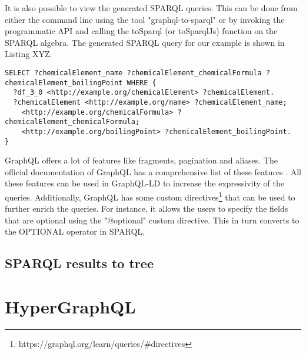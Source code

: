 It is also possible to view the generated SPARQL queries. This can be done from either the command line using the tool "graphql-to-sparql" or by invoking the programmatic API and calling the toSparql (or toSparqlJs) function on the SPARQL algebra. The generated SPARQL query for our example is shown in Listing XYZ.

\begin{minipage}{\linewidth}
\begin{lstlisting}[label=listing:listing9, caption={Genertaed SPARQL query}]
SELECT ?chemicalElement_name ?chemicalElement_chemicalFormula ?chemicalElement_boilingPoint WHERE {
  ?df_3_0 <http://example.org/chemicalElement> ?chemicalElement.
  ?chemicalElement <http://example.org/name> ?chemicalElement_name;
    <http://example.org/chemicalFormula> ?chemicalElement_chemicalFormula;
    <http://example.org/boilingPoint> ?chemicalElement_boilingPoint.
}
\end{lstlisting}
\end{minipage}

GraphQL offers a lot of features like fragments, pagination and aliases. The official documentation of GraphQL has a comprehensive list of these features \cite{GraphQL}. All these features can be used in GraphQL-LD to increase the expressivity of the queries. Additionally, GraphQL has some custom directives\footnote{https://graphql.org/learn/queries/\#directives} that can be used to further enrich the queries. For instance, it allows the users to specify the fields that are optional using the "@optional" custom directive. This in turn converts to the OPTIONAL operator in SPARQL.

\subsection{SPARQL results to tree}

\section{HyperGraphQL}

